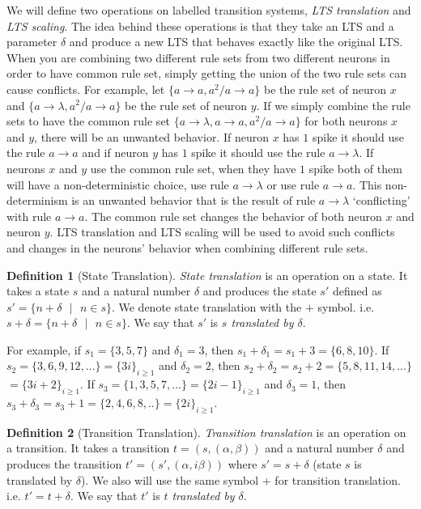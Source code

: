 \documentclass[runningheads,a4paper]{llncs}
\theoremstyle{definition}
\newtheorem{definition2}{Definition}
\newcommand{\ra}{\rightarrow}
\newcommand{\se}{\text{ }}
\begin{document}
We will define two operations on labelled transition systems, \emph{LTS translation} and \emph{LTS
scaling}. The idea behind these operations is that they take an LTS and a parameter $\delta$ and 
produce a new LTS that behaves exactly like the original LTS. When you are combining two different
rule sets from two different neurons in order to have common rule set, simply getting the union of
the two rule sets can cause conflicts. For example, let $\{a \ra a, a^2/a\ra a\}$ be the rule set 
of neuron $x$ and $\{a\ra\lambda,a^2/a\ra a\}$ be the rule set of neuron $y$. If we simply combine
the rule sets to have the common rule set $\{a\ra\lambda,a\ra a, a^2/a\ra a\}$ for both neurons
$x$ and $y$, there will be an unwanted behavior. If neuron $x$ has $1$ spike it
should use the rule $a\ra a$ and if neuron $y$ has $1$ spike it should use the rule $a\ra \lambda$.
If neurons $x$ and $y$ use the common rule set, when they have $1$ spike both of them will have
a non-deterministic choice, use rule $a\ra \lambda$ or use rule $a\ra a$. This non-determinism is 
an unwanted behavior that is the result of rule $a\ra\lambda$ `conflicting' with rule $a\ra a$. The 
common rule set changes the behavior of both neuron $x$ and neuron $y$. LTS translation and LTS 
scaling will be used to avoid such conflicts and changes in the neurons' behavior when combining
different rule sets. 

\begin{definition2}[State Translation] 
\emph{State translation} is an operation on a state. It takes a state $s$ and a natural number 
$\delta$ and produces the state $s'$ defined as $s' = \{n + \delta\se|\se n \in s\}$. We
denote state translation with the $+$ symbol. i.e. $s+\delta = \{n + \delta\se|\se n \in s\}$.
We say that $s'$ is \emph{$s$ translated by $\delta$}.
\end{definition2}

For example, if $s_1=\{3,5,7\}$ and $\delta_1 = 3$, then $s_1+\delta_1 = s_1+3 = \{6,8,10\}$. If
$s_2 = \{3,6,9, 12,...\}= \{3i\}_{i\geq 1}$ and $\delta_2 = 2$, then $s_2+\delta_2 = s_2+2 = 
\{5,8,11,14,...\}$ $=\{3i+2\}_{i\geq 1}$. If $s_3 = \{1,3,5,7,...\} =\{2i-1\}_{i\geq 1}$ and 
$\delta_3=1$, then $s_3+\delta_3 = s_3 + 1 = \{2,4,6,8,..\}=\{2i\}_{i\geq 1}$.

\begin{definition2}[Transition Translation]
\emph{Transition translation} is an operation on a transition. It takes a transition $t = (s,
(\alpha,\beta))$ and a natural number $\delta$ and produces the transition $t'=(s',(\alpha,i
\beta))$ where $s'=s+\delta$ (state $s$ is translated by $\delta$). We also will use the same symbol 
$+$ for transition translation. i.e. $t' = t +\delta$. We say that $t'$ is \emph{$t$ translated by
$\delta$}.
\end{definition2}
\end{document}

